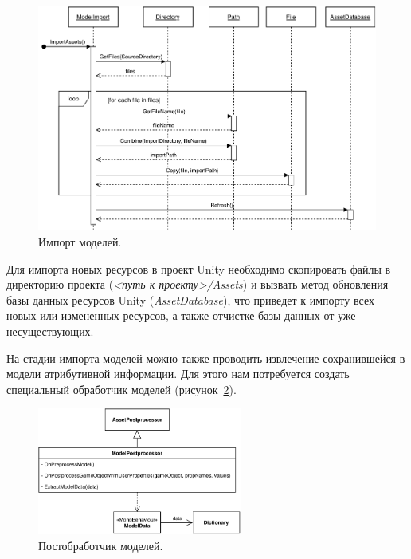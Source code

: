 \begin{figure}[ht]
    \centering
    \includegraphics[width=1.0\textwidth]{images/UML-SImportModels.pdf}
    \caption{Импорт моделей.}
    \label{figure:SImportModels}
\end{figure}

Для импорта новых ресурсов в проект Unity необходимо скопировать
файлы в директорию проекта (\emph{<путь к проекту>/Assets})
и вызвать метод обновления базы данных ресурсов Unity (\emph{AssetDatabase}),
что приведет к импорту всех новых или измененных ресурсов,
а также отчистке базы данных от уже несуществующих.%
\cite{DocUnity}

На стадии импорта моделей можно также проводить извлечение
сохранившейся в модели атрибутивной информации.
Для этого нам потребуется создать специальный обработчик моделей
(рисунок~\ref{figure:CPostprocessor}). 

\begin{figure}[!htp]
    \centering
    \includegraphics[width=0.6\textwidth]{images/UML-CPostprocessor.pdf}
    \caption{Постобработчик моделей.}
    \label{figure:CPostprocessor}
\end{figure}

